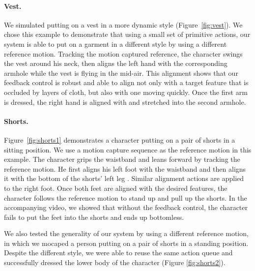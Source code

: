 \paragraph{Vest.} We simulated putting on a vest in a more dynamic style (Figure~\ref{fig:vest}). We chose this example to demonstrate that using a small set of primitive actions, our system is able to put on a garment in a different style by using a different reference motion. Tracking the motion captured reference, the character swings the vest around his neck, then aligns the left hand with the corresponding armhole while the vest is flying in the mid-air. This alignment shows that our feedback control is robust and able to align not only with a target feature that is occluded by layers of cloth, but also with one moving quickly. Once the first arm is dressed, the right hand is aligned with and stretched into the second armhole. 

\paragraph{Shorts.} Figure~\ref{fig:shorts1} demonstrates a character putting on a pair of shorts in a sitting position. We use a motion capture sequence as the reference motion in this example. The character grips the waistband and leans forward by tracking the reference motion. He first aligns his left foot with the waistband and then aligns it with the bottom of the shorts' left leg .  Similar alignment actions are applied to the right foot. Once both feet are aligned with the desired features, the character follows the reference motion to stand up and pull up the shorts. In the accompanying video, we showed that without the feedback control, the character fails to put the feet into the shorts and ends up bottomless.

We also tested the generality of our system by using a different reference motion, in which we mocaped a person putting on a pair of shorts in a standing position. Despite the different style, we were able to reuse the same action queue and successfully dressed the lower body of the character (Figure \ref{fig:shorts2}).

